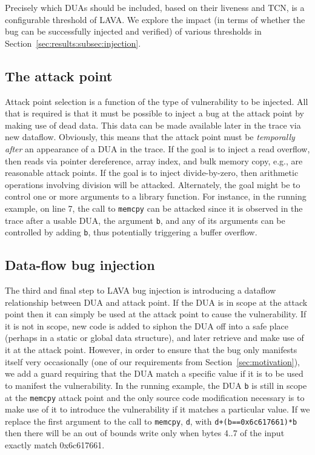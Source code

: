 Precisely which DUAs should be included, based on their liveness and TCN, is a configurable threshold of LAVA.
We explore the impact (in terms of whether the bug can be successfully injected and verified) of various thresholds in Section~\ref{sec:results:subsec:injection}.

\subsection {The attack point}

Attack point selection is a function of the type of vulnerability to be injected.
All that is required is that it must be possible to inject a bug at the attack point by making use of dead data.
This data can be made available later in the trace via new dataflow.
Obviously, this means that the attack point must be \emph{temporally after} an appearance of a DUA in the trace.
If the goal is to inject a read overflow, then reads via pointer dereference, array index, and bulk memory copy, e.g., are reasonable attack points.  
If the goal is to inject divide-by-zero, then arithmetic operations involving division will be attacked. 
Alternately, the goal might be to control one or more arguments to a library function.
For instance, in the running example, on line 7, the call to \verb+memcpy+ can be attacked since it is observed in the trace after a usable DUA, the argument \verb+b+, and any of its arguments can be controlled by adding \verb+b+, thus potentially triggering a buffer overflow. 

\subsection {Data-flow bug injection}

The third and final step to LAVA bug injection is introducing a dataflow relationship between DUA and attack point.  
If the DUA is in scope at the attack point then it can simply be used at the attack point to cause the vulnerability.
If it is not in scope, new code is added to siphon the DUA off into a safe place (perhaps in a static or global data structure), and later retrieve and make use of it at the attack point. 
However, in order to ensure that the bug only manifests itself very occasionally (one of our requirements from Section~\ref{sec:motivation}), we add a guard requiring that the DUA match a specific value if it is to be used to manifest the vulnerability.
In the running example, the DUA \verb+b+ is still in scope at the \verb+memcpy+ attack point and the only source code modification necessary is to make use of it to introduce the vulnerability if it matches a particular value.  
If we replace the first argument to the call to \verb+memcpy+, \verb+d+, with \verb-d+(b==0x6c617661)*b- then there will be an out of bounds write only when bytes 4..7 of the input exactly match 0x6c617661. 

